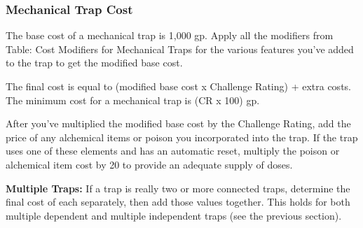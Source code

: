 \documentclass{article}
\begin{document}
\vspace{12pt}
\subsubsection*{\textbf{Mechanical Trap Cost}}

The base cost of a mechanical trap is 1,000 gp. Apply all the modifiers from Table: 
Cost Modifiers for Mechanical Traps for the various features you've added to the 
trap to get the modified base cost.

The final cost is equal to (modified base cost x Challenge Rating) + extra costs. 
The minimum cost for a mechanical trap is (CR x 100) gp.

After you've multiplied the modified base cost by the Challenge Rating, add the 
price of any alchemical items or poison you incorporated into the trap. If the 
trap uses one of these elements and has an automatic reset, multiply the poison 
or alchemical item cost by 20 to provide an adequate supply of doses.

\textbf{Multiple Traps:} If a trap is really two or more connected traps, determine 
the final cost of each separately, then add those values together. This holds for 
both multiple dependent and multiple independent traps (see the previous section).
\end{document}
